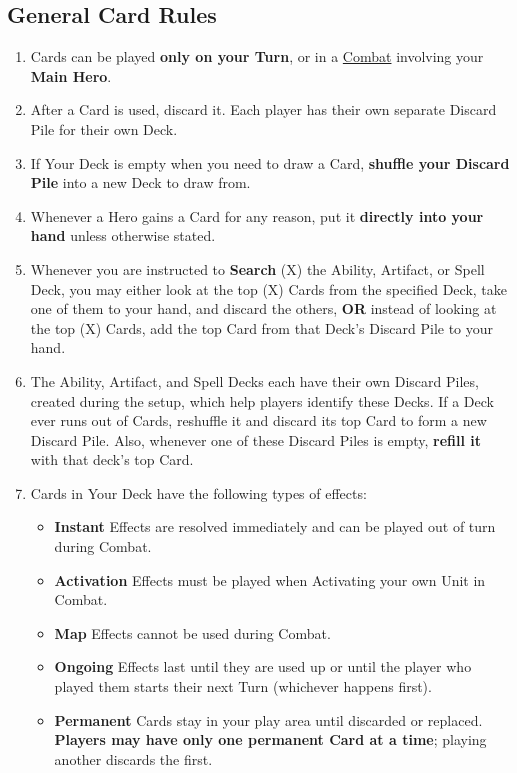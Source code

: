 \begin{multicols*}{2}
\subsection*{General Card Rules}
\begin{enumerate}
  \item Cards can be played \textbf{only on your Turn}, or in a \hyperlink{Combat}{Combat} involving your \textbf{Main Hero}.
  \item After a Card is used, discard it.
    Each player has their own separate Discard Pile for their own Deck.
  \item If Your Deck is empty when you need to draw a Card, \textbf{shuffle your Discard Pile} into a new Deck to draw from.
  \item Whenever a Hero gains a Card for any reason, put it \textbf{directly into your hand} unless otherwise stated.
  \item Whenever you are instructed to \textbf{Search} (X) the Ability, Artifact, or Spell Deck, you may either look at the top (X) Cards from the specified Deck, take one of them to your hand, and discard the others, \textbf{OR} instead of looking at the top (X) Cards, add the top Card from that Deck's Discard Pile to your hand.
  \item The Ability, Artifact, and Spell Decks each have their own Discard Piles, created during the setup, which help players identify these Decks.
    If a Deck ever runs out of Cards, reshuffle it and discard its top Card to form a new Discard Pile.
    Also, whenever one of these Discard Piles is empty, \textbf{refill it} with that deck's top Card.
  \item Cards in Your Deck have the following types of effects:
  \begin{itemize}
    \item \textbf{Instant}  Effects are resolved immediately and can be played out of turn during Combat.
    \item \textbf{Activation}  Effects must be played when Activating your own Unit in Combat.
    \item \textbf{Map}  Effects cannot be used during Combat.
    \item \textbf{Ongoing}  Effects last until they are used up or until the player who played them starts their next Turn (whichever happens first).
    \item \textbf{Permanent}  Cards stay in your play area until discarded or replaced.
      \textbf{Players may have only one permanent Card at a time}; playing another discards the first.
  \end{itemize}
\end{enumerate}


\end{multicols*}
